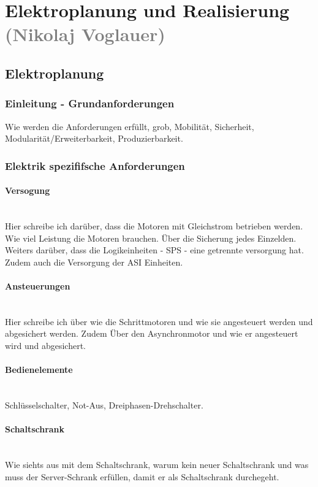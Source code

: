 \section{Elektroplanung und Realisierung \textcolor{gray}{(Nikolaj Voglauer)}}

\subsection{Elektroplanung}
\label{sec:Elektroplanung}

\subsubsection{Einleitung - Grundanforderungen}
    Wie werden die Anforderungen erfüllt, grob, Mobilität, Sicherheit, Modularität/Erweiterbarkeit, Produzierbarkeit.

\subsubsection{Elektrik spezififsche Anforderungen}
\label{sec:Elektrik spezififsche Anforderungen}

    \paragraph{Versogung}\mbox{}\\
    Hier schreibe ich darüber, dass die Motoren mit Gleichstrom betrieben werden. Wie viel Leistung die Motoren brauchen. Über die Sicherung jedes Einzelden. Weiters darüber, dass die Logikeinheiten - SPS - eine getrennte versorgung hat. Zudem auch die Versorgung der ASI Einheiten. 

    \paragraph{Ansteuerungen}\mbox{}\\
    Hier schreibe ich über wie die Schrittmotoren und wie sie angesteuert werden und abgesichert werden. Zudem Über den Asynchronmotor und wie er angesteuert wird und abgesichert. 

    \paragraph{Bedienelemente}\mbox{}\\
    Schlüsselschalter, Not-Aus, Dreiphasen-Drehschalter.

    \paragraph{Schaltschrank}\mbox{}\\
    Wie siehts aus mit dem Schaltschrank, warum kein neuer Schaltschrank und was muss der Server-Schrank erfüllen, damit er als Schaltschrank durchegeht. 

